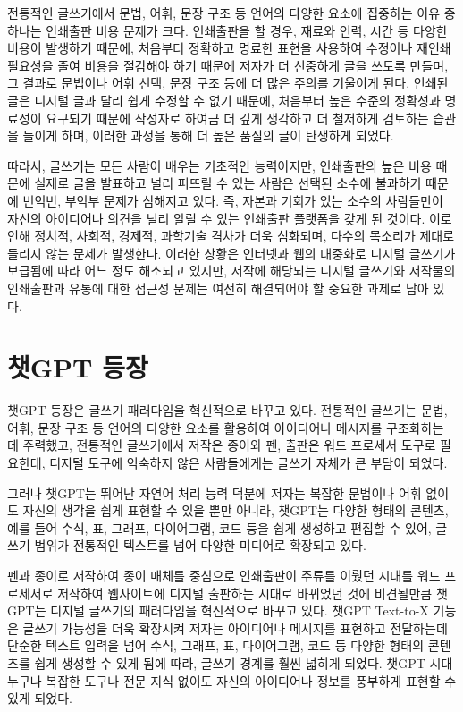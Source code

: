 \documentclass[
  letterpaper,
]{book}
\begin{document}
전통적인 글쓰기에서 문법, 어휘, 문장 구조 등 언어의 다양한 요소에
집중하는 이유 중 하나는 인쇄출판 비용 문제가 크다. 인쇄출판을 할 경우,
재료와 인력, 시간 등 다양한 비용이 발생하기 때문에, 처음부터 정확하고
명료한 표현을 사용하여 수정이나 재인쇄 필요성을 줄여 비용을 절감해야
하기 때문에 저자가 더 신중하게 글을 쓰도록 만들며, 그 결과로 문법이나
어휘 선택, 문장 구조 등에 더 많은 주의를 기울이게 된다. 인쇄된 글은
디지털 글과 달리 쉽게 수정할 수 없기 때문에, 처음부터 높은 수준의
정확성과 명료성이 요구되기 때문에 작성자로 하여금 더 깊게 생각하고 더
철저하게 검토하는 습관을 들이게 하며, 이러한 과정을 통해 더 높은 품질의
글이 탄생하게 되었다.

따라서, 글쓰기는 모든 사람이 배우는 기초적인 능력이지만, 인쇄출판의 높은
비용 때문에 실제로 글을 발표하고 널리 퍼뜨릴 수 있는 사람은 선택된
소수에 불과하기 때문에 빈익빈, 부익부 문제가 심해지고 있다. 즉, 자본과
기회가 있는 소수의 사람들만이 자신의 아이디어나 의견을 널리 알릴 수 있는
인쇄출판 플랫폼을 갖게 된 것이다. 이로 인해 정치적, 사회적, 경제적,
과학기술 격차가 더욱 심화되며, 다수의 목소리가 제대로 들리지 않는 문제가
발생한다. 이러한 상황은 인터넷과 웹의 대중화로 디지털 글쓰기가 보급됨에
따라 어느 정도 해소되고 있지만, 저작에 해당되는 디지털 글쓰기와 저작물의
인쇄출판과 유통에 대한 접근성 문제는 여전히 해결되어야 할 중요한 과제로
남아 있다.

\hypertarget{uxcc57gpt-uxb4f1uxc7a5}{%
\section{챗GPT 등장}\label{uxcc57gpt-uxb4f1uxc7a5}}

챗GPT 등장은 글쓰기 패러다임을 혁신적으로 바꾸고 있다. 전통적인 글쓰기는
문법, 어휘, 문장 구조 등 언어의 다양한 요소를 활용하여 아이디어나
메시지를 구조화하는 데 주력했고, 전통적인 글쓰기에서 저작은 종이와 펜,
출판은 워드 프로세서 도구로 필요한데, 디지털 도구에 익숙하지 않은
사람들에게는 글쓰기 자체가 큰 부담이 되었다.

그러나 챗GPT는 뛰어난 자연어 처리 능력 덕분에 저자는 복잡한 문법이나
어휘 없이도 자신의 생각을 쉽게 표현할 수 있을 뿐만 아니라, 챗GPT는
다양한 형태의 콘텐츠, 예를 들어 수식, 표, 그래프, 다이어그램, 코드 등을
쉽게 생성하고 편집할 수 있어, 글쓰기 범위가 전통적인 텍스트를 넘어
다양한 미디어로 확장되고 있다.

펜과 종이로 저작하여 종이 매체를 중심으로 인쇄출판이 주류를 이뤘던
시대를 워드 프로세서로 저작하여 웹사이트에 디지털 출판하는 시대로
바뀌었던 것에 비견될만큼 챗GPT는 디지털 글쓰기의 패러다임을 혁신적으로
바꾸고 있다. 챗GPT Text-to-X 기능은 글쓰기 가능성을 더욱 확장시켜 저자는
아이디어나 메시지를 표현하고 전달하는데 단순한 텍스트 입력을 넘어 수식,
그래프, 표, 다이어그램, 코드 등 다양한 형태의 콘텐츠를 쉽게 생성할 수
있게 됨에 따라, 글쓰기 경계를 훨씬 넓히게 되었다. 챗GPT 시대 누구나
복잡한 도구나 전문 지식 없이도 자신의 아이디어나 정보를 풍부하게 표현할
수 있게 되었다.
\end{document}
